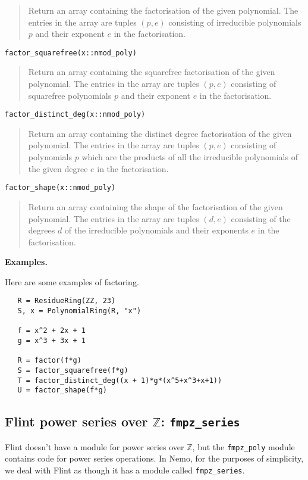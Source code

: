 \documentclass[a4paper,10pt]{article}
\newcommand{\Z}{\mathbb{Z}}
\newcommand{\code}{\lstinline}
\newcommand{\desc}[1]{\vspace{-3mm}\begin{quote}#1\end{quote}}
\begin{document}
{{\desc{Return an array containing the factorisation of the given polynomial. The entries in
the array are tuples $(p, e)$ consisting of irreducible polynomials $p$ and their exponent
$e$ in the factorisation.}

\begin{lstlisting}
factor_squarefree(x::nmod_poly)
\end{lstlisting}

\desc{Return an array containing the squarefree factorisation of the given polynomial. The
entries in the array are tuples $(p, e)$ consisting of squarefree polynomials $p$ and their
exponent $e$ in the factorisation.}

\begin{lstlisting}
factor_distinct_deg(x::nmod_poly)
\end{lstlisting}

\desc{Return an array containing the distinct degree factorisation of the given polynomial.
The entries in the array are tuples $(p, e)$ consisting of polynomials $p$ which are the
products of all the irreducible polynomials of the given degree $e$ in the factorisation.}

\begin{lstlisting}
factor_shape(x::nmod_poly)
\end{lstlisting}

\desc{Return an array containing the shape of the factorisation of the given polynomial.
The entries in the array are tuples $(d, e)$ consisting of the degrees $d$ of the
irreducible polynomials and their exponents $e$ in the factorisation.}

\textbf{Examples.}

Here are some examples of factoring.

\begin{lstlisting}
   R = ResidueRing(ZZ, 23)
   S, x = PolynomialRing(R, "x")

   f = x^2 + 2x + 1
   g = x^3 + 3x + 1

   R = factor(f*g)
   S = factor_squarefree(f*g)
   T = factor_distinct_deg((x + 1)*g*(x^5+x^3+x+1))
   U = factor_shape(f*g)
\end{lstlisting}

\subsection{Flint power series over $\Z$: \code{fmpz_series}}

Flint doesn't have a module for power series over $\Z$, but the \code{fmpz_poly}
module contains code for power series operations. In Nemo, for the purposes of
simplicity, we deal with Flint as though it has a module called \code{fmpz_series}.

}}
\end{document}
